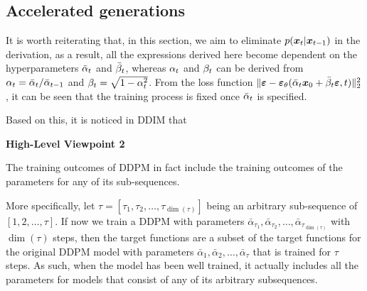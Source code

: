 \subsection{Accelerated generations}
It is worth reiterating that, in this section, we aim to eliminate $p(\bm{x}_{t}|\bm{x}_{t-1})$ in the derivation, as a result, all the expressions derived here become dependent on the hyperparameters $\bar{\alpha}_t$ and $\bar{\beta}_t$, whereas $\alpha_t$ and $\beta_t$ can be derived from $\alpha_t=\bar{\alpha}_t/\bar{\alpha}_{t-1}$ and $\beta_t=\sqrt{1-\alpha_t^2}$. From the loss function $\|\bm{\varepsilon}-\bm{\varepsilon}_\theta(\bar{\alpha}_t\bm{x}_0+\bar{\beta}_t\bm{\varepsilon},t) \|_2^2$, it can be seen that the training process is fixed once $\bar{\alpha}_t$ is specified. 

Based on this, it is noticed in DDIM that
\begin{myquote}
    \textbf{High-Level Viewpoint 2}

    The training outcomes of DDPM in fact include the training outcomes of the parameters for any of its sub-sequences.
\end{myquote}

More specifically, let $\tau=[\tau_1,\tau_2,\ldots,\tau_{\dim(\tau)}]$ being an arbitrary sub-sequence of $[1,2,\ldots,\tau]$. If now we train a DDPM with parameters $\bar{\alpha}_{\tau_1},\bar{\alpha}_{\tau_2},\ldots,\bar{\alpha}_{\tau_{\dim(\tau)}}$ with $\dim(\tau)$ steps, then the target functions are a subset of the target functions for the original DDPM model with parameters $\bar{\alpha}_{1},\bar{\alpha}_{2},\ldots,\bar{\alpha}_\tau$ that is trained for $\tau$ steps. As such, when the model has been well trained, it actually includes all the parameters for models that consist of any of its arbitrary subsequences.

